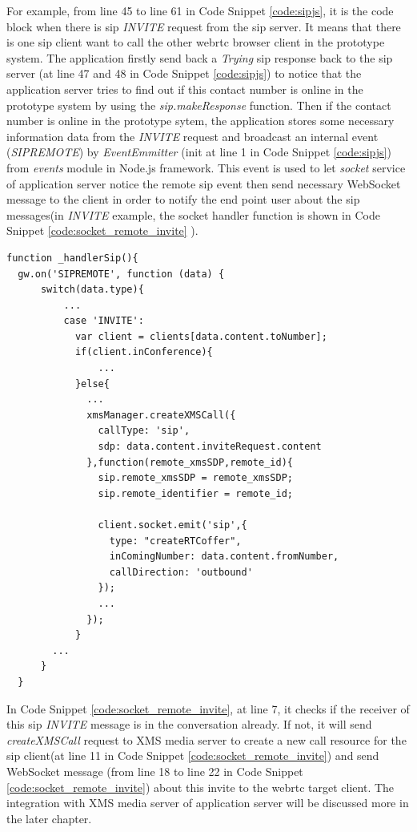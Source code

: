 \par For example, from line 45 to line 61 in Code Snippet \ref{code:sipjs}, it is the code block when there is \gls{sip} \textit{INVITE} request from the \gls{sip} server. It means that there is one \gls{sip} client want to call the other \gls{webrtc} browser client in the prototype system. The application firstly send back a \textit{Trying} \gls{sip} response back to the \gls{sip} server (at line 47 and 48 in Code Snippet \ref{code:sipjs}) to notice that the application server tries to find out if this contact number is online in the prototype system by using the \textit{sip.makeResponse} function. Then if the contact number is online in the prototype sytem, the application stores some necessary information data from the \textit{INVITE} request and broadcast an internal event (\textit{SIPREMOTE}) by \textit{EventEmmitter} (init at line 1 in Code Snippet \ref{code:sipjs}) from \textit{events} module in Node.js framework. This event is used to let \textit{socket} service of application server notice the remote \gls{sip} event then send necessary WebSocket message to the client in order to notify the end point user about the \gls{sip} messages(in \textit{INVITE} example, the socket handler function is shown in Code Snippet \ref{code:socket_remote_invite} ).

\begin{lstlisting}[caption={SIPREMOTE event handler for INVITE message},label={code:socket_remote_invite}]
function _handlerSip(){
  gw.on('SIPREMOTE', function (data) {
      switch(data.type){
          ...
          case 'INVITE':
            var client = clients[data.content.toNumber];
            if(client.inConference){
                ...
            }else{
              ...
              xmsManager.createXMSCall({
                callType: 'sip',
                sdp: data.content.inviteRequest.content
              },function(remote_xmsSDP,remote_id){
                sip.remote_xmsSDP = remote_xmsSDP;
                sip.remote_identifier = remote_id;

                client.socket.emit('sip',{
                  type: "createRTCoffer",
                  inComingNumber: data.content.fromNumber,
                  callDirection: 'outbound'
                });
                ...
              });
            }
        ...
      }
  }
\end{lstlisting}

\par In Code Snippet \ref{code:socket_remote_invite}, at line 7, it checks if the receiver of this \gls{sip} \textit{INVITE} message is in the conversation already. If not, it will send \textit{createXMSCall} request to XMS media server to create a new call resource for the \gls{sip} client(at line 11 in Code Snippet \ref{code:socket_remote_invite}) and send WebSocket message (from line 18 to line 22 in Code Snippet \ref{code:socket_remote_invite}) about this invite to the \gls{webrtc} target client. The integration with XMS media server of application server will be discussed more in the later chapter.

